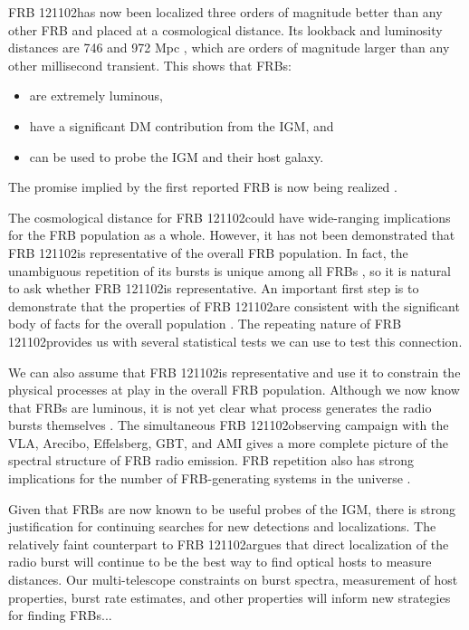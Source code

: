\documentclass{emulateapj}
\newcommand{\frb}{FRB 121102}
\begin{document}
\frb has now been localized three orders of magnitude better than any other FRB and placed at a cosmological distance. Its lookback and luminosity distances are 746 and 972 Mpc \citep{planck15}, which are orders of magnitude larger than any other millisecond transient. This shows that FRBs:
\begin{itemize}
 \item are extremely luminous, 
 \item have a significant DM contribution from the IGM, and
 \item can be used to probe the IGM and their host galaxy.
\end{itemize}
The promise implied by the first reported FRB is now being realized \citep{2007Sci...318..777L}.

The cosmological distance for \frb could have wide-ranging implications for the FRB population as a whole. However, it has not been demonstrated that \frb is representative of the overall FRB population. In fact, the unambiguous repetition of its bursts is unique among all FRBs \citep{2015MNRAS.454..457P}, so it is natural to ask whether \frb is representative. An important first step is to demonstrate that the properties of \frb are consistent with the significant body of facts for the overall population \citep{2015MNRAS.451.3278M, 2016MPLA...3130013K}. The repeating nature of \frb provides us with several statistical tests we can use to test this connection.

We can also assume that \frb is representative and use it to constrain the physical processes at play in the overall FRB population. Although we now know that FRBs are luminous, it is not yet clear what process generates the radio bursts themselves \citep{2014PhRvD..89j3009K, 2014ApJ...785L..26L, 2016MNRAS.457..232C}. The simultaneous \frb observing campaign with the VLA, Arecibo, Effelsberg, GBT, and AMI gives a more complete picture of the spectral structure of FRB radio emission. FRB repetition also has strong implications for the number of FRB-generating systems in the universe \citep{2016MNRAS.458L..89C}.

Given that FRBs are now known to be useful probes of the IGM, there is strong justification for continuing searches for new detections and localizations. The relatively faint counterpart to \frb argues that direct localization of the radio burst will continue to be the best way to find optical hosts to measure distances. Our multi-telescope constraints on burst spectra, measurement of host properties, burst rate estimates, and other properties will inform new strategies for finding FRBs...
\end{document}
